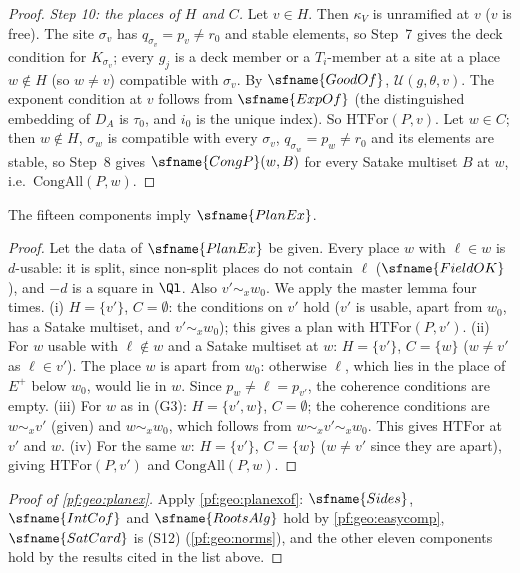 \begin{proof}
\emph{Step 10: the places of $H$ and $C$.} Let $v\in H$. Then $\kappa_V$ is unramified at $v$ ($v$ is free). The site $\sigma_v$ has
$q_{\sigma_v}=p_v\ne r_0$ and stable elements, so Step~7 gives the deck condition for $K_{\sigma_v}$; every $g_j$ is a deck member or a $T_i$-member at
a site at a place $w\notin H$ (so $w\ne v$) compatible with $\sigma_v$. By $\sfname{GoodOf}$, $\mathcal U(g,\theta,v)$. The exponent condition at $v$
follows from $\sfname{ExpOf}$ (the distinguished embedding of $D_A$ is $\tau_0$, and $i_0$ is the unique index). So $\mathrm{HTFor}(P,v)$. Let
$w\in C$; then $w\notin H$, $\sigma_w$ is compatible with every $\sigma_v$, $q_{\sigma_w}=p_w\ne r_0$ and its elements are stable, so Step~8 gives
$\sfname{CongP}(w,B)$ for every Satake multiset $B$ at $w$, i.e.\ $\mathrm{CongAll}(P,w)$.
\end{proof}

\begin{theorem}\label{pf:geo:planexof}
The fifteen components imply $\sfname{PlanEx}$.
\end{theorem}

\begin{proof}
Let the data of $\sfname{PlanEx}$ be given. Every place $w$ with $\ell\in w$ is $d$-usable: it is split, since non-split places do not contain
$\ell$ ($\sfname{FieldOK}$), and $-d$ is a square in $\Ql$. Also $v'\sim_xw_0$. We apply the master lemma four times.
(i) $H=\{v'\}$, $C=\emptyset$: the conditions on $v'$ hold ($v'$ is usable, apart from $w_0$, has a Satake multiset, and $v'\sim_xw_0$); this gives a
plan with $\mathrm{HTFor}(P,v')$. (ii) For $w$ usable with $\ell\notin w$ and a Satake multiset at $w$: $H=\{v'\}$, $C=\{w\}$ ($w\ne v'$ as
$\ell\in v'$). The place $w$ is apart from $w_0$: otherwise $\ell$, which lies in the place of $E^+$ below $w_0$, would lie in $w$. Since $p_w\ne\ell=p_{v'}$,
the coherence conditions are empty. (iii) For $w$ as in (G3): $H=\{v',w\}$, $C=\emptyset$; the coherence conditions are $w\sim_xv'$ (given)
and $w\sim_xw_0$, which follows from $w\sim_xv'\sim_xw_0$. This gives $\mathrm{HTFor}$ at $v'$ and $w$. (iv) For the same $w$: $H=\{v'\}$, $C=\{w\}$
($w\ne v'$ since they are apart), giving $\mathrm{HTFor}(P,v')$ and $\mathrm{CongAll}(P,w)$.
\end{proof}

\begin{proof}[Proof of \cref{pf:geo:planex}]
Apply \cref{pf:geo:planexof}: $\sfname{Sides}$, $\sfname{IntCof}$ and $\sfname{RootsAlg}$ hold by \cref{pf:geo:easycomp}, $\sfname{SatCard}$
is (S12) (\cref{pf:geo:norms}), and the other eleven components hold by the results cited in the list above.
\end{proof}

